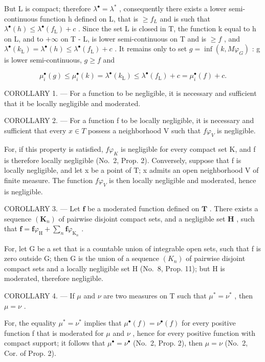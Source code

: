 But L is compact; therefore \(\lambda^{\bullet} = \lambda^{*}\) , consequently there exists a lower semi-continuous function h defined on L, that is \(\geqslant f_{L}\) and is such that \(\lambda^{\bullet}(h) \leqslant \lambda^{\bullet}(f_{\mathrm{L}}) + c\) . Since the set L is closed in T, the function k equal to h on L, and to \(+\infty\) on T - L, is lower semi-continuous on T and is \(\geqslant f\) , and \(\lambda^{\bullet}(k_{\mathrm{L}}) = \lambda^{\bullet}(h) \leqslant \lambda^{\bullet}(f_{\mathrm{L}}) + c\) . It remains only to set \(g = \inf(k, M\varphi_{G})\) : g is lower semi-continuous, \(g \geqslant f\) and

\[
\mu_ {i} ^ {\bullet} (g) \leqslant \mu_ {i} ^ {\bullet} (k) = \lambda^ {\bullet} (k _ {\mathrm{L}}) \leqslant \lambda^ {\bullet} (f _ {\mathrm{L}}) + c = \mu_ {i} ^ {\bullet} (f) + c.
\]

COROLLARY 1. --- For a function to be negligible, it is necessary and sufficient that it be locally negligible and moderated.

COROLLARY 2. --- For a function f to be locally negligible, it is necessary and sufficient that every \(x \in T\) possess a neighborhood V such that \(f\varphi_{V}\) is negligible.

For, if this property is satisfied, \(f\varphi_{K}\) is negligible for every compact set K, and f is therefore locally negligible (No.~2, Prop. 2). Conversely, suppose that f is locally negligible, and let x be a point of T; x admits an open neighborhood V of finite measure. The function \(f\varphi_{V}\) is then locally negligible and moderated, hence is negligible.

COROLLARY 3. --- Let \(\mathbf{f}\) be a moderated function defined on \(\mathbf{T}\) . There exists a sequence \((\mathbf{K}_n)\) of pairwise disjoint compact sets, and a negligible set \(\mathbf{H}\) , such that \(\mathbf{f} = \mathbf{f}\varphi_{\mathrm{H}} + \sum_{n} \mathbf{f}\varphi_{\mathrm{K}_n}\) .

For, let G be a set that is a countable union of integrable open sets, such that f is zero outside G; then G is the union of a sequence \((K_{n})\) of pairwise disjoint compact sets and a locally negligible set H (No.~8, Prop. 11); but H is moderated, therefore negligible.

COROLLARY 4. --- If \(\mu\) and \(\nu\) are two measures on T such that \(\mu^{*} = \nu^{*}\) , then \(\mu = \nu\) .

For, the equality \(\mu^{*}=\nu^{*}\) implies that \(\mu^{\bullet}(f)=\nu^{\bullet}(f)\) for every positive function f that is moderated for \(\mu\) and \(\nu\) , hence for every positive function with compact support; it follows that \(\mu^{\bullet}=\nu^{\bullet}\) (No.~2, Prop. 2), then \(\mu=\nu\) (No.~2, Cor. of Prop. 2).

